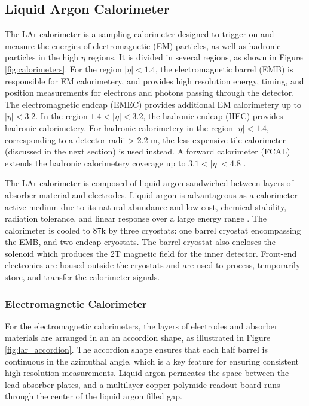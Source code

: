 \subsection{Liquid Argon Calorimeter}
\label{sec:lar}
The LAr calorimeter is a sampling calorimeter designed to trigger on and measure the energies of electromagnetic (EM) particles, as well as hadronic particles in the high $\eta$ regions. It is divided in several regions, as shown in Figure \ref{fig:calorimeters}. For the region $|\eta| < 1.4$, the electromagnetic barrel (EMB) is responsible for EM calorimetery, and provides high resolution energy, timing, and position measurements for electrons and photons passing through the detector. The electromagnetic endcap (EMEC) provides additional EM calorimetery up to $|\eta|<3.2$. In the region $1.4 < |\eta| < 3.2$, the hadronic endcap (HEC) provides hadronic calorimetery. For hadronic calorimetery in the region $|\eta| < 1.4$, corresponding to a detector radii > 2.2 m, the less expensive tile calorimeter (discussed in the next section) is used instead. A forward calorimeter (FCAL) extends the hadronic calorimetery coverage up to $3.1 < |\eta| < 4.8$ \cite{lar_tdr}. \par
 
The LAr calorimeter is composed of liquid argon sandwiched between layers of absorber material and electrodes. Liquid argon is advantageous as a calorimeter active medium due to its natural abundance and low cost, chemical stability, radiation tolerance, and linear response over a large energy range \cite{lar_ssc}. The calorimeter is cooled to 87k by three cryostats: one barrel cryostat encompassing the EMB, and two endcap cryostats. The barrel cryostat also encloses the solenoid which produces the 2T magnetic field for the inner detector. Front-end electronics are housed outside the cryostats and are used to process, temporarily store, and transfer the calorimeter signals. \par

\subsubsection{Electromagnetic Calorimeter}
For the electromagnetic calorimeters, the layers of electrodes and absorber materials are arranged in an an accordion shape, as illustrated in Figure \ref{fig:lar_accordion}. The accordion shape ensures that each half barrel is continuous in the azimuthal angle, which is a key feature for ensuring consistent high resolution measurements. Liquid argon permeates the space between the lead absorber plates, and a multilayer copper-polymide readout board runs through the center of the liquid argon filled gap. \par

